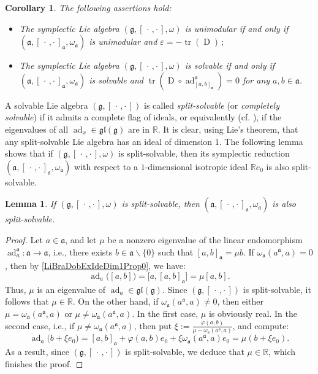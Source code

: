 \documentclass[final,1p,times,nopreprintline]{elsarticle}
\newtheorem{lemma}{Lemma}[section]
\newtheorem{corollary}{Corollary}[section]
\theoremstyle{definition}
\numberwithin{equation}{section}
\newcommand{\ro}{\circ}
\newcommand{\rel}{\mathbb{R}}
\newcommand{\w}{\omega}
\newcommand{\tr}{\operatorname{tr}}
\newcommand{\g}{\mathfrak{g}}
\newcommand{\ai}{\mathfrak{a}}
\newcommand{\ad}{\operatorname{ad}}
\numberwithin{equation}{section}
\newcommand{\D}{\operatorname{D}}
\newcommand{\gl}{\mathfrak{gl}}
\newcommand{\cro}{[\,\cdot\,,\cdot\,]}
\begin{document}
\begin{corollary}\label{CorSec2-1UnimSolv}
	The following assertions hold:
	\begin{itemize}
		\item[$1.$] The symplectic Lie algebra $(\g,[\,\cdot\,,\cdot\,],\w)$ is unimodular if and only if $(\ai,[\,\cdot\,,\cdot\,]_\ai,\w_\ai)$ is unimodular and $\varepsilon=-\tr(\D)\,;$
		\item[$2.$] The symplectic Lie algebra $(\g,[\,\cdot\,,\cdot\,],\w)$ is solvable if and only if $(\ai,[\,\cdot\,,\cdot\,]_\ai,\w_\ai)$ is solvable and $\tr(\D\ro\ad^\ai_{[a,b]_\ai})=0$ for any $a,b\in\ai$.
	\end{itemize}
\end{corollary}

A solvable Lie algebra $(\g,\cro)$ is called \textit{split-solvable} (or \textit{completely solvable}) if it admits a complete flag of ideals, or equivalently (cf. \cite[p. 45]{Kna}), if the eigenvalues of all $\ad_x\in\gl(\g)$ are in $\rel$. It is clear, using Lie's theorem, that any split-solvable Lie algebra has an ideal of dimension $1$. The following lemma shows that if $(\g,\cro,\w)$ is split-solvable, then its symplectic reduction $(\ai,\cro_\ai,\w_\ai)$ with respect to a $1$-dimensional isotropic ideal $\rel e_0$ is also split-solvable.

\begin{lemma}
	If $(\g,\cro,\w)$ is split-solvable, then $(\ai,\cro_\ai,\w_\ai)$ is also split-solvable.
\end{lemma}

\begin{proof}
Let $a\in\ai$, and let $\mu$ be a nonzero eigenvalue of the linear endomorphism $\ad^\ai_a:\ai\to\ai$, i.e., there exists $b\in\ai\backslash\{0\}$ such that $[a,b]_\ai=\mu b$. If $\w_\ai(a^\ai,a)= 0$, then by \eqref{LiBraDobExIdeDim1Prop0}, we have:
\begin{equation*}
\ad_a\big([a,b]\big)=\big[a,[a,b]_\ai\big]=\mu [a,b].
\end{equation*}
Thus, $\mu$ is an eigenvalue of $\ad_a \in \gl(\g)$. Since $(\g, \cro)$ is split-solvable, it follows that $\mu \in \rel$. On the other hand, if $\w_\ai(a^\ai,a)\neq 0$, then either $\mu=\w_\ai(a^\ai,a)$ or $\mu\neq\w_\ai(a^\ai,a)$. In the first case, $\mu$ is obviously real. In the second case, i.e., if $\mu\neq\w_\ai(a^\ai,a)$, then put $\xi:=\frac{\varphi(a,b)}{\mu-\w_\ai(a^\ai,a)}$, and compute:
\begin{equation*}
\ad_a\big(b+\xi e_0\big)=[a,b]_\ai+\varphi(a,b)e_0+\xi\w_\ai(a^\ai,a) e_0=\mu(b+\xi e_0).
\end{equation*}
As a result, since $(\g,\cro)$ is split-solvable, we deduce that $\mu\in\rel$, which finishes the proof.
\end{proof}
\end{document}
